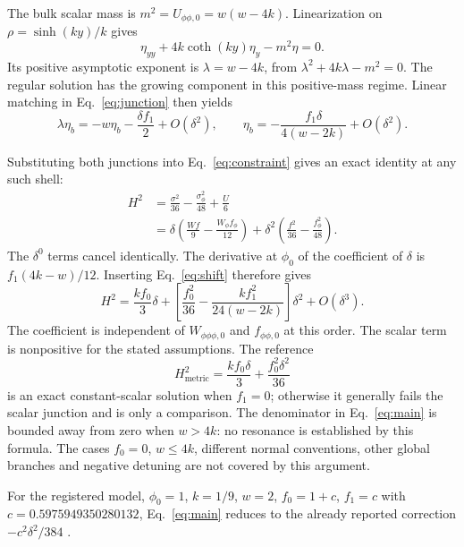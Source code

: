 \documentclass[11pt]{article}
\begin{document}
The bulk scalar mass is $m^2=U_{\phi\phi,0}=w(w-4k)$. Linearization on $\rho=\sinh(ky)/k$ gives
\begin{equation}
 \eta_{yy}+4k\coth(ky)\eta_y-m^2\eta=0.
\end{equation}
Its positive asymptotic exponent is $\lambda=w-4k$, from $\lambda^2+4k\lambda-m^2=0$. The regular solution has the growing component in this positive-mass regime. Linear matching in Eq.~\eqref{eq:junction} then yields
\begin{equation}
 \lambda\eta_b=-w\eta_b-\frac{\delta f_1}{2}+O(\delta^2),\qquad
 \eta_b=-\frac{f_1\delta}{4(w-2k)}+O(\delta^2).\label{eq:shift}
\end{equation}

Substituting both junctions into Eq.~\eqref{eq:constraint} gives an exact identity at any such shell:
\begin{align}
 H^2&=\frac{\sigma^2}{36}-\frac{\sigma_\phi^2}{48}+\frac{U}{6}\\
 &=\delta\left(\frac{Wf}{9}-\frac{W_\phi f_\phi}{12}\right)
 +\delta^2\left(\frac{f^2}{36}-\frac{f_\phi^2}{48}\right).\label{eq:exact}
\end{align}
The $\delta^0$ terms cancel identically. The derivative at $\phi_0$ of the coefficient of $\delta$ is $f_1(4k-w)/12$. Inserting Eq.~\eqref{eq:shift} therefore gives
\begin{equation}
 \boxed{H^2=\frac{kf_0}{3}\delta+
 \left[\frac{f_0^2}{36}-\frac{k f_1^2}{24(w-2k)}\right]\delta^2+O(\delta^3).}\label{eq:main}
\end{equation}
The coefficient is independent of $W_{\phi\phi\phi,0}$ and $f_{\phi\phi,0}$ at this order. The scalar term is nonpositive for the stated assumptions. The reference
\begin{equation}
 H_{\mathrm{metric}}^2=\frac{kf_0\delta}{3}+\frac{f_0^2\delta^2}{36}
\end{equation}
is an exact constant-scalar solution when $f_1=0$; otherwise it generally fails the scalar junction and is only a comparison. The denominator in Eq.~\eqref{eq:main} is bounded away from zero when $w>4k$: no resonance is established by this formula. The cases $f_0=0$, $w\le4k$, different normal conventions, other global branches and negative detuning are not covered by this argument.

For the registered model, $\phi_0=1$, $k=1/9$, $w=2$, $f_0=1+c$, $f_1=c$ with $c=0.5975949350280132$, Eq.~\eqref{eq:main} reduces to the already reported correction $-c^2\delta^2/384$ \cite{maldonado}.
\end{document}
